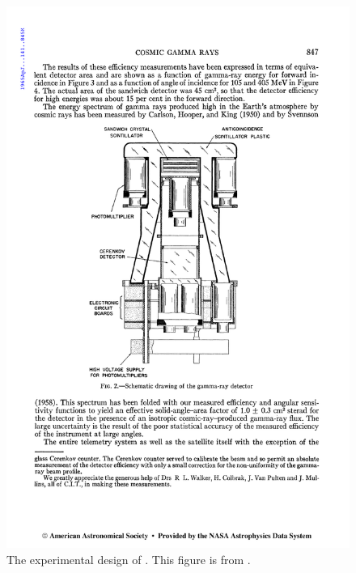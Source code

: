 \begin{figure}[htb]
\centering
\includegraphics{chapters/introduction/figures/explorer_xi_instrument.pdf}
\caption{
The experimental design of \explorerxi.
This figure is from \cite{kraushaar_1965_explorer-experiment}. }
\end{figure}



